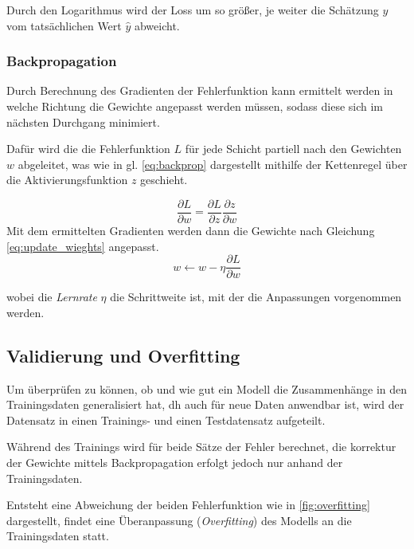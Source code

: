 Durch den Logarithmus wird der Loss um so größer, je weiter die Schätzung $y$ vom 
tatsächlichen Wert $\hat{y}$ abweicht.


\subsubsection{Backpropagation}

Durch Berechnung des Gradienten der Fehlerfunktion kann ermittelt 
werden in welche Richtung die Gewichte angepasst werden müssen,
sodass diese sich im nächsten Durchgang minimiert.

Dafür wird die die Fehlerfunktion $L$ für jede Schicht partiell nach den 
Gewichten $w$ abgeleitet, was wie in gl. \ref{eq:backprop} dargestellt mithilfe der 
Kettenregel über die Aktivierungsfunktion $z$ geschieht.


\begin{equation}
    \label{eq:backprop}
    \frac{\partial L}{\partial w} = \frac{\partial L}{\partial z}\frac{\partial z}{\partial w}
\end{equation}
Mit dem ermittelten Gradienten werden dann die Gewichte nach Gleichung \ref{eq:update_wieghts} angepasst.
\begin{equation}
    \label{eq:update_wieghts}
    w  \leftarrow w - \eta \frac{\partial L}{\partial w}
\end{equation}

wobei die \textit{Lernrate} $\eta$ die Schrittweite ist, mit der die
Anpassungen vorgenommen werden.





\subsection{Validierung und Overfitting}\label{subsec:validation}

Um überprüfen zu können, ob und wie gut ein Modell die Zusammenhänge
in den Trainingsdaten generalisiert hat, dh auch für neue Daten
anwendbar ist,
wird der Datensatz in einen Trainings- und einen Testdatensatz aufgeteilt.

Während des Trainings wird für beide Sätze der Fehler berechnet, 
die korrektur der Gewichte mittels Backpropagation erfolgt
jedoch nur anhand der Trainingsdaten.

Entsteht eine Abweichung der beiden Fehlerfunktion wie in 
\ref{fig:overfitting} dargestellt, findet eine Überanpassung 
(\textit{Overfitting}) des Modells an die Trainingsdaten statt.

